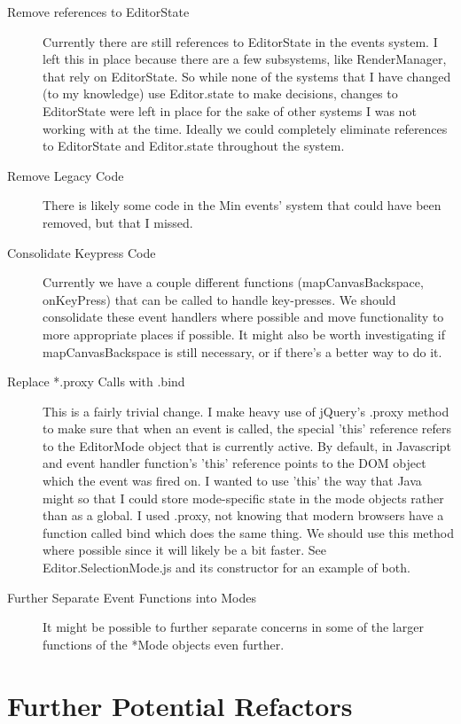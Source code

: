 \documentclass[letterpaper]{article}
\begin{document}
\begin{description}
    \item[Remove references to EditorState] Currently there are still references
        to EditorState in the events system. I left this in place because there
        are a few subsystems, like RenderManager, that rely on EditorState. So
        while none of the systems that I have changed (to my knowledge) use
        Editor.state to make decisions, changes to EditorState were left in
        place for the sake of other systems I was not working with at the time.
        Ideally we could completely eliminate references to EditorState and
        Editor.state throughout the system.
    \item[Remove Legacy Code] There is likely some code in the Min events' system
        that could have been removed, but that I missed. 
    \item[Consolidate Keypress Code] Currently we have a couple different
        functions (mapCanvasBackspace, onKeyPress) that can be called to handle key-presses. We should
        consolidate these event handlers where possible and move functionality
        to more appropriate places if possible. It might also be worth
        investigating if mapCanvasBackspace is still necessary, or if there's a
        better way to do it.
    \item[Replace *.proxy Calls with .bind] This is a fairly trivial change. I
        make heavy use of jQuery's .proxy method to make sure that when an event
        is called, the special 'this' reference refers to the EditorMode object
        that is currently active. By default, in Javascript and event handler
        function's 'this' reference points to the DOM object which the event was
        fired on. I wanted to use 'this' the way that Java might so that I could
        store mode-specific state in the mode objects rather than as a global. I
        used .proxy, not knowing that modern browsers have a function called
        bind which does the same thing. We should use this method where possible
        since it will likely be a bit faster. See Editor.SelectionMode.js and
        its constructor for an example of both.
    \item[Further Separate Event Functions into Modes] It might be
        possible to further separate concerns in some of the larger functions of
        the *Mode objects even further. 
\end{description}

\section*{Further Potential Refactors}
\end{document}
